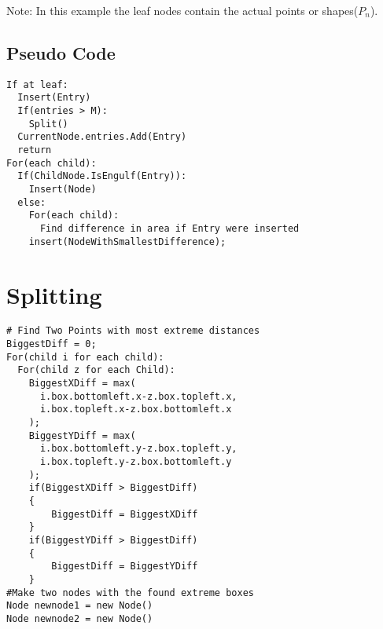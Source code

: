 \documentclass{article}
\begin{document}
\begin{multicols}{2}[]
\begin{minipage}{\linewidth}
\centering
{}

Note: In this example the leaf nodes contain the actual points or shapes($P_n$).
\end{minipage}

\subsection*{Pseudo Code}

\begin{lstlisting}    
If at leaf:
  Insert(Entry)
  If(entries > M):
    Split()
  CurrentNode.entries.Add(Entry)
  return
For(each child):
  If(ChildNode.IsEngulf(Entry)):
    Insert(Node)
  else:
    For(each child):
      Find difference in area if Entry were inserted
    insert(NodeWithSmallestDifference);
\end{lstlisting}


\section{Splitting} 
\begin{lstlisting}
# Find Two Points with most extreme distances
BiggestDiff = 0;
For(child i for each child):
  For(child z for each Child):
    BiggestXDiff = max(
      i.box.bottomleft.x-z.box.topleft.x,
      i.box.topleft.x-z.box.bottomleft.x
    );
    BiggestYDiff = max(
      i.box.bottomleft.y-z.box.topleft.y,
      i.box.topleft.y-z.box.bottomleft.y
    );
    if(BiggestXDiff > BiggestDiff)
    {
        BiggestDiff = BiggestXDiff
    }
    if(BiggestYDiff > BiggestDiff)
    {
        BiggestDiff = BiggestYDiff
    }
#Make two nodes with the found extreme boxes
Node newnode1 = new Node()
Node newnode2 = new Node()


\end{lstlisting}
\end{multicols}
\end{document}

